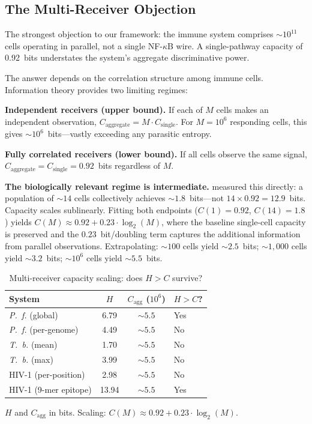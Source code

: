 \documentclass[twocolumn,10pt]{article}
\begin{document}
\subsection{The Multi-Receiver Objection}

The strongest objection to our framework: the immune system comprises ${\sim}10^{11}$ cells operating in parallel, not a single NF-$\kappa$B wire.  A single-pathway capacity of 0.92~bits understates the system's aggregate discriminative power.

The answer depends on the correlation structure among immune cells.  Information theory provides two limiting regimes:

\textbf{Independent receivers (upper bound).}  If each of $M$ cells makes an independent observation, $C_{\text{aggregate}} = M \cdot C_{\text{single}}$.  For $M = 10^6$ responding cells, this gives ${\sim}10^6$~bits---vastly exceeding any parasitic entropy.

\textbf{Fully correlated receivers (lower bound).}  If all cells observe the same signal, $C_{\text{aggregate}} = C_{\text{single}} = 0.92$~bits regardless of $M$.

\textbf{The biologically relevant regime is intermediate.}  \citet{cheong2011} measured this directly: a population of ${\sim}14$ cells collectively achieves ${\sim}1.8$~bits---not $14 \times 0.92 = 12.9$~bits.  Capacity scales sublinearly.  Fitting both endpoints ($C(1) = 0.92$, $C(14) = 1.8$) yields $C(M) \approx 0.92 + 0.23 \cdot \log_2(M)$, where the baseline single-cell capacity is preserved and the $0.23$~bit/doubling term captures the additional information from parallel observations.  Extrapolating: ${\sim}100$ cells yield ${\sim}2.5$~bits; ${\sim}1{,}000$ cells yield ${\sim}3.2$~bits; ${\sim}10^6$ cells yield ${\sim}5.5$~bits.

\begin{table}[t]
\centering
\caption{Multi-receiver capacity scaling: does $H > C$ survive?}
\label{tab:multi}
\footnotesize
\begin{tabular}{@{}lccl@{}}
\toprule
System & $H$ & $C_{\text{agg}}$ ($10^6$) & $H\!>\!C$? \\
\midrule
\textit{P.~f.} (global) & 6.79 & ${\sim}5.5$ & Yes \\
\textit{P.~f.} (per-genome) & 4.49 & ${\sim}5.5$ & No \\
\textit{T.~b.} (mean) & 1.70 & ${\sim}5.5$ & No \\
\textit{T.~b.} (max) & 3.99 & ${\sim}5.5$ & No \\
HIV-1 (per-position) & 2.98 & ${\sim}5.5$ & No \\
HIV-1 (9-mer epitope) & 13.94 & ${\sim}5.5$ & Yes \\
\bottomrule
\end{tabular}
\smallskip

\footnotesize{$H$ and $C_{\text{agg}}$ in bits. Scaling: $C(M) \approx 0.92 + 0.23 \cdot \log_2(M)$.}
\end{table}
\end{document}
